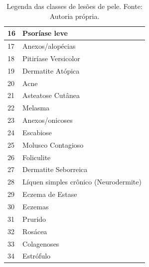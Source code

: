\begin{table}[ht]
\begin{tabular}{l|l}
        16                 & Psoríase leve                                                            \\ \hline
        17                 & Anexos/alopécias                                                         \\ \hline
        18                 & Pitiríase Versicolor                                                     \\ \hline
        19                 & Dermatite Atópica                                                        \\ \hline
        20                 & Acne                                                                     \\ \hline
        21                 & Asteatose Cutânea                                                        \\ \hline
        22                 & Melasma                                                                  \\ \hline
        23                 & Anexos/onicoses                                                          \\ \hline
        24                 & Escabiose                                                                \\ \hline
        25                 & Molusco Contagioso                                                       \\ \hline
        26                 & Foliculite                                                               \\ \hline
        27                 & Dermatite Seborreica                                                     \\ \hline
        28                 & Líquen simples crônico (Neurodermite)                                    \\ \hline
        29                 & Eczema de Estase                                                         \\ \hline
        30                 & Eczemas                                                                  \\ \hline
        31                 & Prurido                                                                  \\ \hline
        32                 & Rosácea                                                                  \\ \hline
        33                 & Colagenoses                                                              \\ \hline
        34                 & Estrófulo                                                                \\ \hline
    \end{tabular}
    \label{tab:skin_lesion_classes_legend}
    \caption{Legenda das classes de lesões de pele. Fonte: Autoria própria.}
\end{table}

